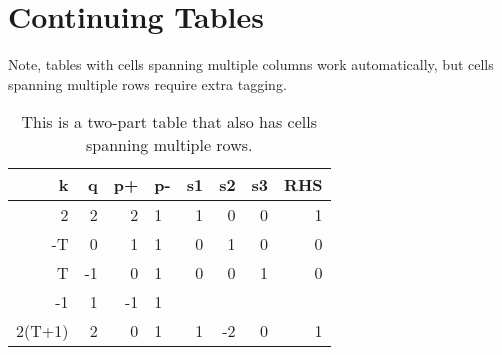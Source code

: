 \section{Continuing Tables}
Note, tables with cells spanning multiple columns work automatically, but cells spanning multiple rows require extra tagging.
\begin{table}[ht]
  \caption{This is a two-part table that also has cells spanning multiple rows.}
  \begin{tabular}{rrrlrrrr}
    k      & q          & p+ & p- & s1                                                         & s2                                                         & s3                                                         & RHS       \\ \hline
    2      & 2          & 2  & 1  & 1                                                          & 0                                                          & 0                                                          & 1         \\
    -T     & 0          & 1  & 1  & 0                                                          & 1                                                          & 0                                                          & 0         \\
    T      & -1         & 0  & 1  & 0                                                          & 0                                                          & 1                                                          & 0         \\
    -1     & 1          & -1 & 1  &                                                            &                                                            &                                                            &           \\ \hline
    2(T+1) & 2          & 0  & 1  & 1                                                          & -2                                                         & 0                                                          & 1         \\ \hline

\end{tabular}
\end{table}
